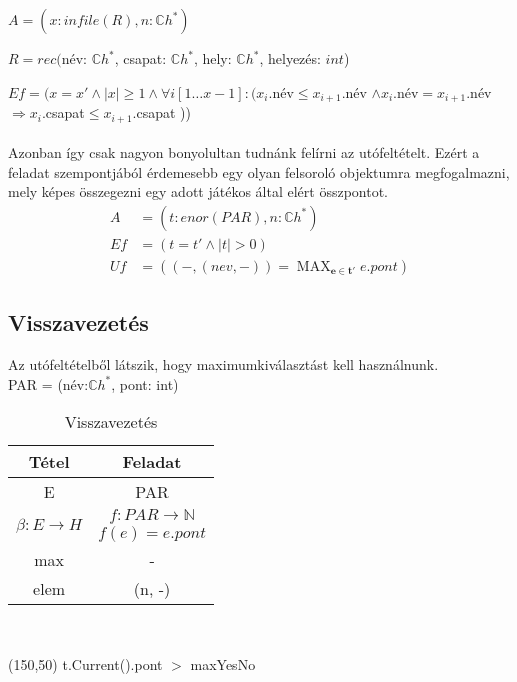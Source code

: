 \documentclass[a4paper]{article}
\DeclareMathOperator*{\maxi}{MAX}
\newcommand*{\field}[1]{\mathbb{#1}}
\begin{document}
			$A = (x: infile(R), n:\field{C}h^*)$\\
			 \begin{flushright}
			 	$R = rec($név: $\field{C}h^*$, csapat: $\field{C}h^*$, hely: $\field{C}h^*$, helyezés: $ int$)\\
			 \end{flushright}
			$Ef = (x = x' \wedge |x| \geq 1 \wedge \forall i [1\ldots x-1]:(x_i$.név$ \leq x_{i+1}$.név 
			$\wedge x_i$.név$ = x_{i+1}$.név$ \Rightarrow x_i$.csapat$ \leq x_{i+1}$.csapat ))	\\\\
			Azonban így csak nagyon bonyolultan tudnánk felírni az utófeltételt. Ezért a feladat szempontjából érdemesebb egy olyan felsoroló objektumra megfogalmazni, mely képes összegezni egy adott játékos által elért összpontot.
			\begin{align*}
				A &= (t: enor(PAR), n:\field{C}h^*)\\
				Ef &= (t = t' \wedge |t|> 0)\\
				Uf &= ((-,(nev,-)) = \maxi_{\mathbf{e \in t'}} e.pont)
			\end{align*}
			\newpage
			\subsection{Visszavezetés}
			Az utófeltételből látszik, hogy maximumkiválasztást kell használnunk.\\PAR = (név:$\field{C}h^*$, pont: int)
			\begin{table}[h!]
				\caption{Visszavezetés}
				\label{tab:visszavezetes}
				\begin{center}
					\begin{tabular}{|c|c|}
						\hline 
						Tétel & Feladat \\ 
						\hline 
						E & PAR \\ 
						\hline 
						\multirow{2}{*}{$\beta:E \longrightarrow H$}& $f: PAR \longrightarrow \field{N}$ \\ 
						& $f(e) = e.pont$ \\ 
						\hline 
						max & - \\ 
						\hline 
						elem & (n, -) \\ 
						\hline 
					\end{tabular} 
				\end{center}
			\end{table}
		\\		
			\begin{struktogramm}(150,50)
				 {t.Current().pont $>$ max}{Yes}{No}
				\change				
				\ifend
				\whileend
			\end{struktogramm}
		\\
\end{document}

